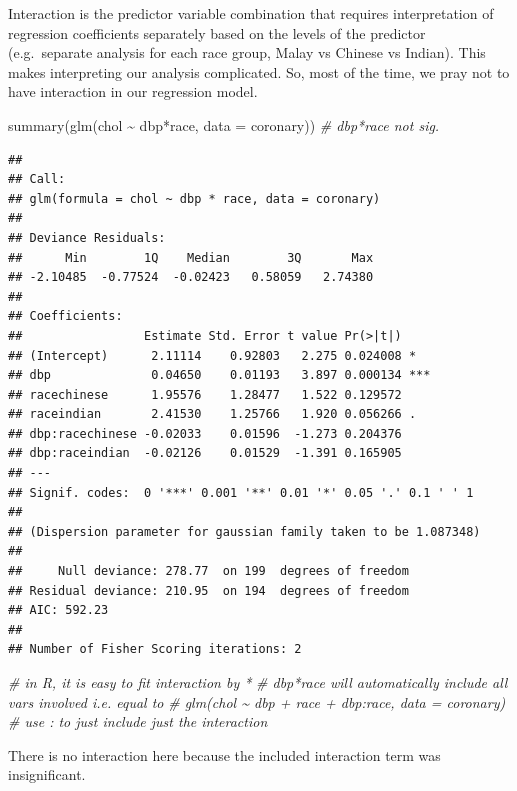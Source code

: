 \documentclass[
]{book}
\makeatletter
\newenvironment{Shaded}{\begin{snugshade}}{\end{snugshade}}
\newcommand{\AttributeTok}[1]{\textcolor[rgb]{0.61,0.61,0.61}{#1}}
\newcommand{\CommentTok}[1]{\textcolor[rgb]{0.37,0.37,0.37}{\textit{#1}}}
\newcommand{\FunctionTok}[1]{\textcolor[rgb]{0,0,0}{#1}}
\newcommand{\NormalTok}[1]{#1}
\newcommand{\SpecialCharTok}[1]{\textcolor[rgb]{0,0,0}{#1}}
\newenvironment{kframe}{%
\medskip{}
\setlength{\fboxsep}{.8em}
 \def\at@end@of@kframe{}%
 \ifinner\ifhmode%
  \def\at@end@of@kframe{\end{minipage}}%
  \begin{minipage}{\columnwidth}%
 \fi\fi%
 \def\FrameCommand##1{\hskip\@totalleftmargin \hskip-\fboxsep
 \colorbox{shadecolor}{##1}\hskip-\fboxsep
     \hskip-\linewidth \hskip-\@totalleftmargin \hskip\columnwidth}%
 \MakeFramed {\advance\hsize-\width
   \@totalleftmargin\z@ \linewidth\hsize
   \@setminipage}}%
 {\par\unskip\endMakeFramed%
 \at@end@of@kframe}
\renewenvironment{Shaded}{\begin{kframe}}{\end{kframe}}
\makeatother
\begin{document}
Interaction is the predictor variable combination that requires interpretation of regression coefficients separately based on the levels of the predictor (e.g.~separate analysis for each race group, Malay vs Chinese vs Indian). This makes interpreting our analysis complicated. So, most of the time, we pray not to have interaction in our regression model.

\begin{Shaded}
\begin{Highlighting}[]
\FunctionTok{summary}\NormalTok{(}\FunctionTok{glm}\NormalTok{(chol }\SpecialCharTok{\textasciitilde{}}\NormalTok{ dbp}\SpecialCharTok{*}\NormalTok{race, }\AttributeTok{data =}\NormalTok{ coronary))  }\CommentTok{\# dbp*race not sig.}
\end{Highlighting}
\end{Shaded}

\begin{verbatim}
## 
## Call:
## glm(formula = chol ~ dbp * race, data = coronary)
## 
## Deviance Residuals: 
##      Min        1Q    Median        3Q       Max  
## -2.10485  -0.77524  -0.02423   0.58059   2.74380  
## 
## Coefficients:
##                 Estimate Std. Error t value Pr(>|t|)    
## (Intercept)      2.11114    0.92803   2.275 0.024008 *  
## dbp              0.04650    0.01193   3.897 0.000134 ***
## racechinese      1.95576    1.28477   1.522 0.129572    
## raceindian       2.41530    1.25766   1.920 0.056266 .  
## dbp:racechinese -0.02033    0.01596  -1.273 0.204376    
## dbp:raceindian  -0.02126    0.01529  -1.391 0.165905    
## ---
## Signif. codes:  0 '***' 0.001 '**' 0.01 '*' 0.05 '.' 0.1 ' ' 1
## 
## (Dispersion parameter for gaussian family taken to be 1.087348)
## 
##     Null deviance: 278.77  on 199  degrees of freedom
## Residual deviance: 210.95  on 194  degrees of freedom
## AIC: 592.23
## 
## Number of Fisher Scoring iterations: 2
\end{verbatim}

\begin{Shaded}
\begin{Highlighting}[]
\CommentTok{\# in R, it is easy to fit interaction by *}
\CommentTok{\# dbp*race will automatically include all vars involved i.e. equal to}
\CommentTok{\# glm(chol \textasciitilde{} dbp + race + dbp:race, data = coronary)}
\CommentTok{\# use : to just include just the interaction}
\end{Highlighting}
\end{Shaded}

There is no interaction here because the included interaction term was insignificant.
\end{document}
